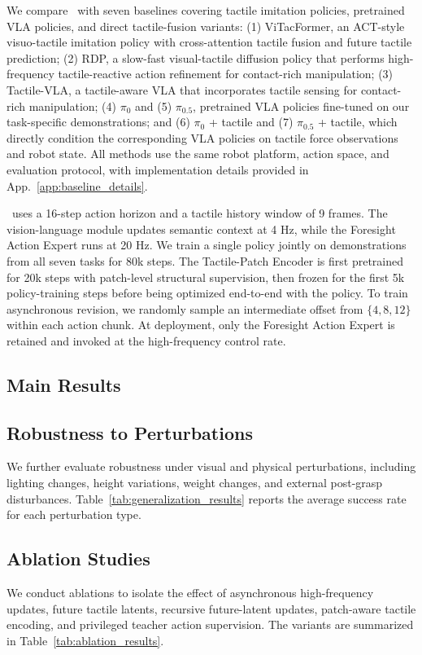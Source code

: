 We compare \systemname\ with seven baselines covering tactile imitation policies, pretrained VLA policies, and direct tactile-fusion variants: (1) ViTacFormer, an ACT-style visuo-tactile imitation policy with cross-attention tactile fusion and future tactile prediction; (2) RDP, a slow-fast visual-tactile diffusion policy that performs high-frequency tactile-reactive action refinement for contact-rich manipulation; (3) Tactile-VLA, a tactile-aware VLA that incorporates tactile sensing for contact-rich manipulation; (4) $\pi_0$ and (5) $\pi_{0.5}$, pretrained VLA policies fine-tuned on our task-specific demonstrations; and (6) $\pi_0$ + tactile and (7) $\pi_{0.5}$ + tactile, which directly condition the corresponding VLA policies on tactile force observations and robot state. All methods use the same robot platform, action space, and evaluation protocol, with implementation details provided in App.~\ref{app:baseline_details}.

\systemname\ uses a 16-step action horizon and a tactile history window of 9 frames. The vision-language module updates semantic context at 4 Hz, while the Foresight Action Expert runs at 20 Hz. We train a single policy jointly on demonstrations from all seven tasks for 80k steps. The Tactile-Patch Encoder is first pretrained for 20k steps with patch-level structural supervision, then frozen for the first 5k policy-training steps before being optimized end-to-end with the policy. To train asynchronous revision, we randomly sample an intermediate offset from \(\{4, 8, 12\}\) within each action chunk. At deployment, only the Foresight Action Expert is retained and invoked at the high-frequency control rate. 

\subsection{Main Results}


\subsection{Robustness to Perturbations}
We further evaluate robustness under visual and physical perturbations, including lighting changes, height variations, weight changes, and external post-grasp disturbances. Table~\ref{tab:generalization_results} reports the average success rate for each perturbation type.



\subsection{Ablation Studies}
We conduct ablations to isolate the effect of asynchronous high-frequency updates, future tactile latents, recursive future-latent updates, patch-aware tactile encoding, and privileged teacher action supervision. The variants are summarized in Table~\ref{tab:ablation_results}.

